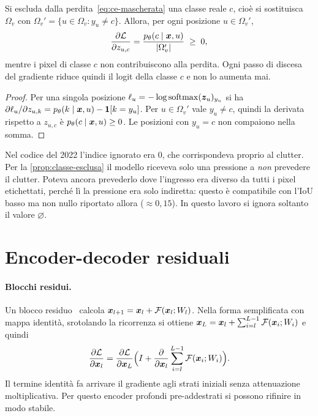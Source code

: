\begin{proposizione}
\label{prop:classe-esclusa}
Si escluda dalla perdita~\eqref{eq:ce-mascherata} una classe reale $c$, cioè si sostituisca
$\Omega_v$ con $\Omega_v'=\{u\in\Omega_v : y_u\neq c\}$. Allora, per ogni posizione
$u\in\Omega_v'$,
\[
  \frac{\partial\mathcal{L}}{\partial z_{u,c}}=\frac{p_\theta(c\mid\bm{x},u)}{\left\lvert \Omega_v' \right\rvert}\;\geq\;0,
\]
mentre i pixel di classe $c$ non contribuiscono alla perdita. Ogni passo di discesa del gradiente
riduce quindi il logit della classe $c$ e non lo aumenta mai.
\end{proposizione}
\begin{proof}
Per una singola posizione $\ell_u=-\log\operatorname{softmax}(\bm{z}_u)_{y_u}$ si ha
$\partial\ell_u/\partial z_{u,k}=p_\theta(k\mid\bm{x},u)-\mathbf{1}[k=y_u]$. Per $u\in\Omega_v'$ vale
$y_u\neq c$, quindi la derivata rispetto a $z_{u,c}$ è $p_\theta(c\mid\bm{x},u)\ge0$. Le
posizioni con $y_u=c$ non compaiono nella somma.
\end{proof}

Nel codice del 2022 l'indice ignorato era 0, che corrispondeva proprio al clutter. Per la
\cref{prop:classe-esclusa} il modello riceveva solo una pressione a \emph{non} prevedere il
clutter. Poteva ancora prevederlo dove l'ingresso era diverso da tutti i pixel etichettati,
perché lì la pressione era solo indiretta: questo è compatibile con l'IoU basso ma non nullo
riportato allora ($\approx0{,}15$). In questo lavoro si ignora soltanto il valore $\varnothing$.

\section{Encoder-decoder residuali}
\label{sec:encoder-decoder}

\paragraph{Blocchi residui.}
Un blocco residuo~\cite{he2016resnet} calcola $\bm{x}_{l+1}=\bm{x}_l+\mathcal{F}(\bm{x}_l;W_l)$.
Nella forma semplificata con mappa identità, srotolando la ricorrenza si ottiene
$\bm{x}_L=\bm{x}_l+\sum_{i=l}^{L-1}\mathcal{F}(\bm{x}_i;W_i)$ e quindi
\begin{equation}
  \frac{\partial\mathcal{L}}{\partial\bm{x}_l}
  =\frac{\partial\mathcal{L}}{\partial\bm{x}_L}
   \Bigl(I+\frac{\partial}{\partial\bm{x}_l}\sum_{i=l}^{L-1}\mathcal{F}(\bm{x}_i;W_i)\Bigr).
\end{equation}
Il termine identità fa arrivare il gradiente agli strati iniziali senza attenuazione
moltiplicativa. Per questo encoder profondi pre-addestrati si possono rifinire in modo stabile.

